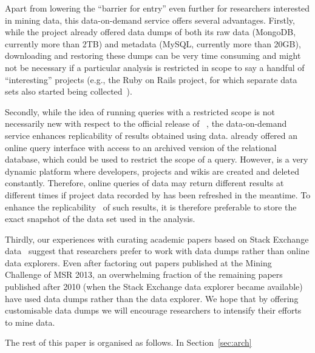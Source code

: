 Apart from lowering the ``barrier for entry'' even further for researchers interested in mining \gh data,
this data-on-demand service offers several advantages.
Firstly, while the \ght project already offered data dumps of both its raw data (MongoDB, currently more than 2TB) 
and metadata (MySQL, currently more than 20GB), downloading and restoring these dumps can be 
very time consuming and might not be necessary if a particular analysis is restricted in scope to say a handful
of ``interesting'' \gh projects (e.g., the Ruby on Rails project, for which separate data sets also started being 
collected~\cite{wagstrom2013network}).

Secondly, while the idea of running queries with a restricted scope is not necessarily new with respect to
the official release of \linebreak \ght~\cite{gousios2013ghtorent}, the data-on-demand service enhances replicability
of results obtained using \ght data. 
\ght already offered an online query interface with access to an archived version of the relational database, 
which could be used to restrict the scope of a query.
However, \gh is a very dynamic platform where developers, projects and wikis are created and deleted constantly.
Therefore, online queries of \ght data may return different results at different times if project data recorded
by \ght has been refreshed in the meantime.
To enhance the replicability~\cite{gonzalez2012reproducibility} of such results, it is therefore preferable to 
store the exact snapshot of the data set used in the analysis.

Thirdly, our experiences with curating academic papers based on Stack Exchange data~\cite{vasilescu2012meta} 
suggest that researchers prefer to work with data dumps rather than online data explorers.
Even after factoring out papers published at the Mining Challenge of MSR 2013, an overwhelming 
fraction of the remaining papers published after 2010 (when the Stack Exchange data explorer became available) 
have used data dumps rather than the data explorer.
We hope that by offering customisable \ght data dumps we will encourage researchers to intensify their efforts
to mine \gh data.

The rest of this paper is organised as follows.
In Section~\ref{sec:arch}

